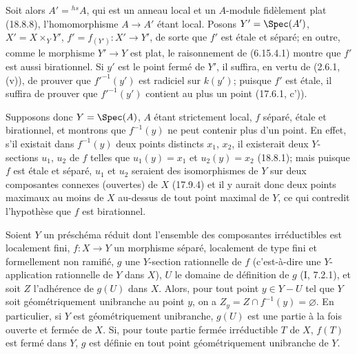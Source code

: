 
Soit alors $A'={}^{hs}\!A$, qui est un anneau local et un $A$-module fidèlement plat (18.8.8), l'homomorphisme $A\to A'$ étant local. Posons $Y'=\Spec(A')$, $X'=X\times_Y Y'$, $f'=f_{(Y')}:X'\to Y'$, de sorte que $f'$ est étale et séparé; en outre, comme le morphisme $Y'\to Y$ est plat, le raisonnement de (6.15.4.1) montre que $f'$ est aussi birationnel. Si $y'$ est le point fermé de $Y'$, il suffira, en vertu de (2.6.1, (v)), de prouver que $f'^{-1}(y')$ est radiciel sur $k(y')$; puisque $f'$ est étale, il suffira de prouver que $f'^{-1}(y')$ contient au plus un point (17.6.1, c')).

Supposons donc $Y=\Spec(A)$, $A$ étant strictement local, $f$ séparé, étale et birationnel, et montrons que $f^{-1}(y)$ ne peut contenir plus d'un point. En effet, s'il existait dans $f^{-1}(y)$ deux points distincts $x_1$, $x_2$, il existerait deux $Y$-sections $u_1$, $u_2$ de $f$ telles que $u_1(y)=x_1$ et $u_2(y)=x_2$ (18.8.1); mais puisque $f$ est étale et séparé, $u_1$ et $u_2$ seraient des isomorphismes de $Y$ sur deux composantes connexes (ouvertes) de $X$ (17.9.4) et il y aurait donc deux points maximaux au moins de $X$ au-dessus de tout point maximal de $Y$, ce qui contredit l'hypothèse que $f$ est birationnel.

\begin{proposition}[18.10.19]
\label{IV.18.10.19}
Soient $Y$ un préschéma réduit dont l'ensemble des composantes irréductibles est localement fini, $f:X\to Y$ un morphisme séparé, localement de type fini et formellement non ramifié, $g$ une $Y$-section rationnelle de $f$ (c'est-à-dire une $Y$-application rationnelle de $Y$ dans $X$), $U$ le domaine de définition de $g$ (I, 7.2.1), et soit $Z$ l'adhérence de $g(U)$ dans $X$. Alors, pour tout point $y\in Y-U$ tel que $Y$ soit géométriquement unibranche au point $y$, on a $Z_y=Z\cap f^{-1}(y)=\varnothing$. En particulier, si $Y$ est géométriquement unibranche, $g(U)$ est une partie à la fois ouverte et fermée de $X$. Si, pour toute partie fermée irréductible $T$ de $X$, $f(T)$ est fermé dans $Y$, $g$ est définie en tout point géométriquement unibranche de $Y$.
\end{proposition}

